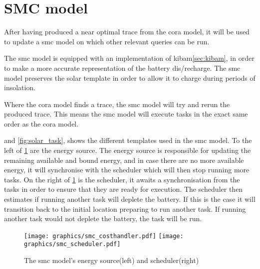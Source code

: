 \section{SMC model} \label{sec:smc}
After having produced a near optimal trace from the \gls{cora} model, it will be used to update a \gls{smc} model on which other relevant queries can be run.

The \gls{smc} model is equipped with an implementation of \gls{kibam}\cref{sec:kibam}, in order to make a more accurate representation of the battery dis/recharge. The \gls{smc} model preserves the solar template in order to allow it to charge during periods of insolation.

Where the \gls{cora} model finds a trace, the \gls{smc} model will try and rerun the produced trace. This means the \gls{smc} model will execute tasks in the exact same order as the \gls{cora} model.%

 and \cref{fig:solar_task}, shows the different templates used in the \gls{smc} model. To the left of \cref{fig:cost_schedule} are the energy source. The energy source is responsible for updating the remaining available and bound energy, and in case there are no more available energy, it will synchronise with the scheduler which will then stop running more tasks.
On the right of \cref{fig:cost_schedule} is the scheduler, it awaits a synchronisation from the tasks in order to ensure that they are ready for execution. The scheduler then estimates if running another task will deplete the battery. If this is the case it will transition back to the initial location preparing to run another task. If running another task would not deplete the battery, the task will be run.

\begin{figure}[H]%
	\centering
	\subfloat
	{{\texttt{[image: graphics/smc\_costhandler.pdf]} }}%
	\qquad
	\subfloat
	{{\texttt{[image: graphics/smc\_scheduler.pdf]} }}%
	\caption{The \gls{smc} model's energy source(left) and scheduler(right)}%
	\label{fig:cost_schedule}%
\end{figure}

